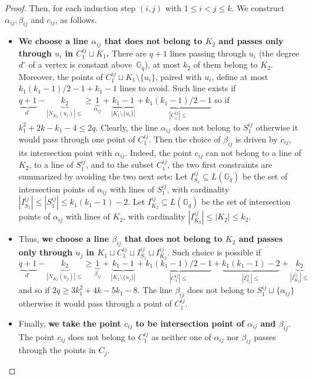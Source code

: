 \documentclass[10pt,a4paper]{article}
\newcommand{\ls}{\leqslant}
\newcommand{\gs}{\geqslant}
\newcommand{\G}[1][q]{\mathbb{G}_{#1}}
\begin{document}
\begin{proof}
        Then, for each induction step $(i,j)$ with $1 \ls i < j \ls k$. We construct $\alpha_{ij}, \beta_{ij}$ and $c_{ij}$, as follows.
        \begin{itemize}
            \item \textbf{We choose a line $\alpha_{ij}$ that does not belong to $K_2$ and passes only through $u_i$ in $C_1^{ij}\sqcup K_1 $.}
            There are $q+1$ lines passing through $u_i$ (the degree $d^\circ$ of a vertex is constant above~$\G$), at most $k_2$ of them belong to $K_2$. Moreover, the points of $C_1^{ij} \sqcup K_1 \setminus \{u_i\}$, paired with $u_i$, define at most $k_1(k_1-1)/2-1+ k_1 - 1 $ lines to avoid. Such line exists if \\ $\underbrace{q+1}_{d^\circ}- \underbrace{k_2}_{|N_{K_2}(u_i)|\ls} \gs \underbrace{1}_{\alpha_{ij}} + \underbrace{k_1 - 1}_{|K_1 \setminus \{u_i\}|} + \underbrace{k_1(k_1 - 1) /2 - 1}_{|C_1^{ij}|\ls}$ so if $k_1^2+2k-k_1-4\ls 2q$. Clearly, the line $\alpha_{ij}$ does not belong to $S_1^{ij}$ otherwise it would pass through one point of $C_1^{ij}$. Then the choice of $\beta_{ij}$ is driven by  $c_{ij}$, its intersection point with $\alpha_{ij}$. Indeed, the point $c_{ij}$ can not belong to a line of $K_2$, to a line of $S_1^{ij}$, and to the subset $C_1^{ij}$, the two first constraints are summarized by avoiding the two next sets:
            Let $I_{S_1}^{ij} \subseteq L(\G)$ be the set of intersection points of $\alpha_{ij}$ with lines of $S_1^{ij}$, with cardinality $|I_{S_1}^{ij}| \ls |S_1^{ij}| \ls k_1(k_1-1) - 2$. 
            Let $I_{K_2}^{ij} \subseteq L(\G)$ be the set of intersection points of $\alpha_{ij}$ with lines of $K_2$, with cardinality $|I_{K_2}^{ij}| \ls |K_2| \ls k_2$. 
            \item Thus, \textbf{we choose a line $\beta_{ij}$ that does not belong to $K_2$ and passes only through $u_j$ in $ K_1 \sqcup C_1^{ij} \sqcup I_{S_1}^{ij} \sqcup I_{K_2}^{ij}$}. Such choice is possible if
                  \[\underbrace{q+1}_{d^\circ} - \underbrace{k_2}_{|N_{K_2}(u_j)|\ls} \gs \underbrace{1}_{\beta_{ij}} + \underbrace{k_1 - 1}_{|K_1 \setminus \{u_j\}|} + \underbrace{k_1(k_1 - 1) /2 - 1}_{|C_1^{ij}|\ls} + \underbrace{k_1(k_1 - 1) - 2}_{|I_{S_1}^{ij}|\ls} + \underbrace{k_2}_{|I_{K_2}^{ij}|\ls} \]
                  and so if $2q \gs 3k_1^2+4k-5k_1-8$. The line $\beta_{ij}$ does not belong to $S_1^{ij} \sqcup \{\alpha_{ij}\}$ otherwise it would pass through a point of $C_1^{ij}$. 
            \item Finally, \textbf{we take the point $c_{ij}$ to be intersection point of $\alpha_{ij}$ and $\beta_{ij}$}. The point $c_{ij}$ does not belong to $C_1^{ij}$ as neither one of $\alpha_{ij}$ nor $\beta_{ij}$ passes through the points in $C_j$.

\end{itemize}
\end{proof}
\end{document}
